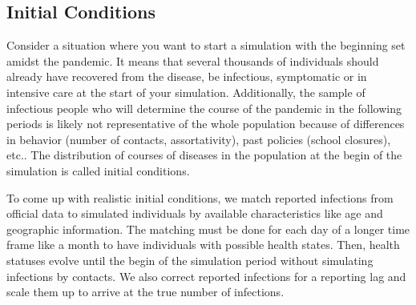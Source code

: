 \subsection{Initial Conditions} %
\label{sub:initial_conditions}

Consider a situation where you want to start a simulation with the beginning set amidst
the pandemic. It means that several thousands of individuals should already have
recovered from the disease, be infectious, symptomatic or in intensive care at the start
of your simulation. Additionally, the sample of infectious people who will determine the
course of the pandemic in the following periods is likely not representative of the
whole population because of differences in behavior (number of contacts,
assortativity), past policies (school closures), etc.. The distribution of courses of
diseases in the population at the begin of the simulation is called initial conditions.

To come up with realistic initial conditions, we match reported infections from official
data to simulated individuals by available characteristics like age and geographic
information. The matching must be done for each day of a longer time frame like a month
to have individuals with possible health states. Then, health statuses evolve until the
begin of the simulation period without simulating infections by contacts. We also
correct reported infections for a reporting lag and scale them up to arrive at the true
number of infections.

